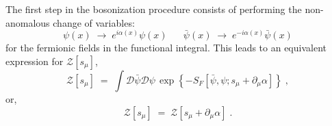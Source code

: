 \documentclass[a4paper,12pt]{article}
\begin{document}
The first step in the bosonization procedure consists of performing
the non-anomalous change of variables:
\begin{equation}
  \label{eq:stp1}
  \psi(x) \;\to\; e^{i \alpha (x)} \psi(x) \;\;\;\;\;\; {\bar\psi}(x)
  \;\to\; e^{-i \alpha (x)} {\bar\psi}(x)
\end{equation}
for the fermionic fields in the functional integral. This leads to an
equivalent expression for ${\mathcal Z}[s_\mu]$,
\begin{equation}
  \label{eq:stp2}
 {\mathcal Z}[s_\mu] \;=\; \int {\mathcal D}{\bar\psi} {\mathcal
    D}\psi \, \exp \left\{- S_F[{\bar\psi},\psi; s_\mu + \partial_\mu \alpha] \right\} \;,
\end{equation}
or,
\begin{equation}
  \label{eq:stp2a}
 {\mathcal Z}[s_\mu] \;=\; {\mathcal Z}[s_\mu + \partial_\mu \alpha] \;.
\end{equation}
\end{document}
